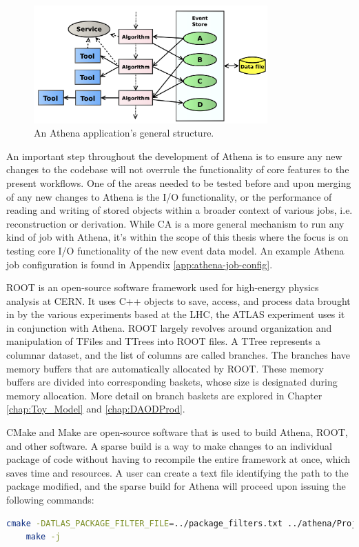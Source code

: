 \begin{figure}[ht]
  \centering
  \includegraphics[width=0.8\textwidth]{content/img/athena job.png}
  \caption{An Athena application's general structure.\cite{Aad:2895022}}
  \label{fig:ATLAS_Athena_Job_flow}
\end{figure}

An important step throughout the development of Athena is to ensure any new changes to the codebase will not overrule the functionality of core features to the present workflows.
One of the areas needed to be tested before and upon merging of any new changes to Athena is the I/O functionality, or the performance of reading and writing of stored objects within a broader context of various jobs, i.e. reconstruction or derivation.
While CA is a more general mechanism to run any kind of job with Athena, it's within the scope of this thesis where the focus is on testing core I/O functionality of the new event data model. 
An example Athena job configuration is found in Appendix \ref{app:athena-job-config}. 

ROOT is an open-source software framework used for high-energy physics analysis at CERN.\cite{ROOT_about} 
It uses C++ objects to save, access, and process data brought in by the various experiments based at the LHC, the ATLAS experiment uses it in conjunction with Athena.
ROOT largely revolves around organization and manipulation of TFiles and TTrees into ROOT files.
A TTree represents a columnar dataset, and the list of columns are called branches. 
The branches have memory buffers that are automatically allocated by ROOT. 
These memory buffers are divided into corresponding baskets, whose size is designated during memory allocation.
More detail on branch baskets are explored in Chapter \ref{chap:Toy_Model} and \ref{chap:DAODProd}.

CMake and Make are open-source software that is used to build Athena, ROOT, and other software.
A sparse build is a way to make changes to an individual package of code without having to recompile the entire framework at once, which saves time and resources. 
A user can create a text file identifying the path to the package modified, and the sparse build for Athena will proceed upon issuing the following commands:
\begin{lstlisting}[language=bash]
    cmake -DATLAS_PACKAGE_FILTER_FILE=../package_filters.txt ../athena/Projects/WorkDir/ 
    make -j
\end{lstlisting}

